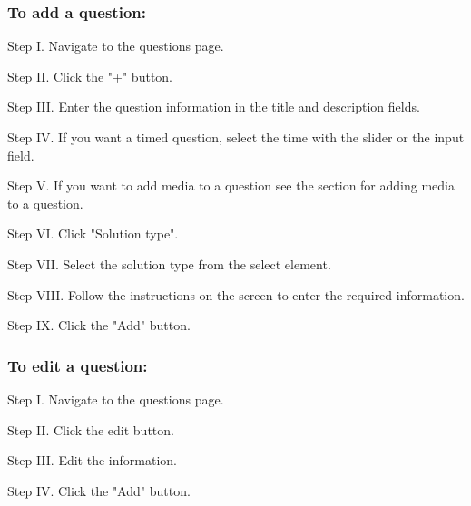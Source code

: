 \subsubsection{To add a question:}
\begin{userManualItemlist}
    \item[Step I.] Navigate to the questions page.
    \item[Step II.] Click the "+" button.
    \item[Step III.] Enter the question information in the title and description fields.
    \item[Step IV.] If you want a timed question, select the time with the slider or the input field.
    \item[Step V.] If you want to add media to a question see the section for adding media to a question.
    \item[Step VI.] Click "Solution type".
    \item[Step VII.] Select the solution type from the select element.
    \item[Step VIII.] Follow the instructions on the screen to enter the required information.
    \item[Step IX.] Click the "Add" button. 
\end{userManualItemlist}

\subsubsection{To edit a question:}
\begin{userManualItemlist}
    \item[Step I.] Navigate to the questions page.
    \item[Step II.] Click the edit button.
    \item[Step III.] Edit the information.
    \item[Step IV.] Click the "Add" button.  
\end{userManualItemlist}

